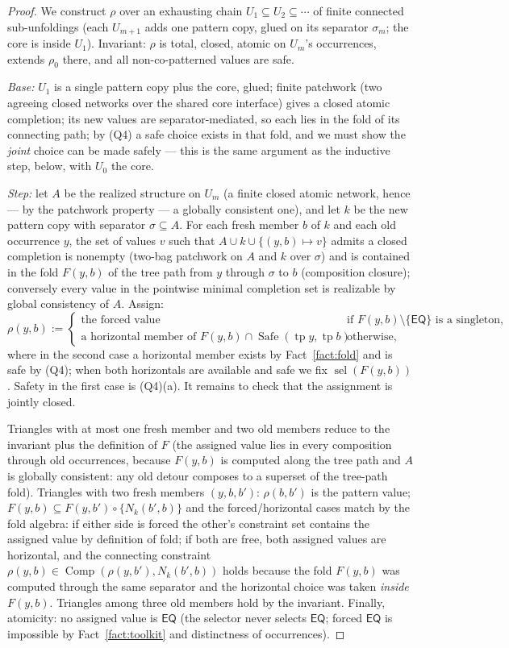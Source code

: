 \documentclass[11pt]{article}
\theoremstyle{definition}
\newcommand{\EQ}{\mathsf{EQ}}
\newcommand{\Comp}{\operatorname{Comp}}
\newcommand{\sel}{\operatorname{sel}}
\newcommand{\tp}{\operatorname{tp}}
\newcommand{\Safe}{\operatorname{Safe}}
\begin{document}
\begin{proof}
We construct $\rho$ over an exhausting chain
$U_1\subseteq U_2\subseteq\cdots$ of finite connected sub-unfoldings
(each $U_{m+1}$ adds one pattern copy, glued on its separator
$\sigma_m$; the core is inside $U_1$).  Invariant: $\rho$ is total,
closed, atomic on $U_m$'s occurrences, extends $\rho_0$ there, and all
non-co-patterned values are safe.

\emph{Base:} $U_1$ is a single pattern copy plus the core, glued;
finite patchwork (two agreeing closed networks over the shared core
interface) gives a closed atomic completion; its new values are
separator-mediated, so each lies in the fold of its connecting path;
by (Q4) a safe choice exists in that fold, and we must show the
\emph{joint} choice can be made safely --- this is the same argument as
the inductive step, below, with $U_0$ the core.

\emph{Step:} let $A$ be the realized structure on $U_m$ (a finite
closed atomic network, hence --- by the patchwork property --- a
globally consistent one), and let $k$ be the new pattern copy with
separator $\sigma\subseteq A$.  For each fresh member $b$ of $k$ and
each old occurrence $y$, the set of values $v$ such that
$A\cup k\cup\{(y,b)\mapsto v\}$ admits a closed completion is nonempty
(two-bag patchwork on $A$ and $k$ over $\sigma$) and is contained in
the fold $F(y,b)$ of the tree path from $y$ through $\sigma$ to $b$
(composition closure); conversely every value in the pointwise minimal
completion set is realizable by global consistency of $A$.  Assign:
\[
\rho(y,b):=
\begin{cases}
\text{the forced value} & \text{if } F(y,b)\setminus\{\EQ\}
\text{ is a singleton},\\[2pt]
\text{a horizontal member of } F(y,b)\cap\Safe(\tp y,\tp b) &
\text{otherwise,}
\end{cases}
\]
where in the second case a horizontal member exists by
Fact~\ref{fact:fold} and is safe by (Q4); when both horizontals are
available and safe we fix $\sel(F(y,b))$.  Safety in the first case is
(Q4)(a).  It remains to check that the assignment is jointly closed.

Triangles with at most one fresh member and two old members reduce to
the invariant plus the definition of $F$ (the assigned value lies in
every composition through old occurrences, because $F(y,b)$ is computed
along the tree path and $A$ is globally consistent: any old detour
composes to a superset of the tree-path fold).  Triangles with two
fresh members $(y,b,b')$: $\rho(b,b')$ is the pattern value;
$F(y,b)\subseteq F(y,b')\circ\{N_k(b',b)\}$ and the forced/horizontal
cases match by the fold algebra: if either side is forced the other's
constraint set contains the assigned value by definition of fold; if
both are free, both assigned values are horizontal, and the connecting
constraint $\rho(y,b)\in\Comp(\rho(y,b'),N_k(b',b))$ holds because the
fold $F(y,b)$ was computed through the same separator and the
horizontal choice was taken \emph{inside} $F(y,b)$.  Triangles among
three old members hold by the invariant.  Finally, atomicity: no
assigned value is $\EQ$ (the selector never selects $\EQ$; forced
$\EQ$ is impossible by Fact~\ref{fact:toolkit} and distinctness of
occurrences).


\end{proof}
\end{document}
